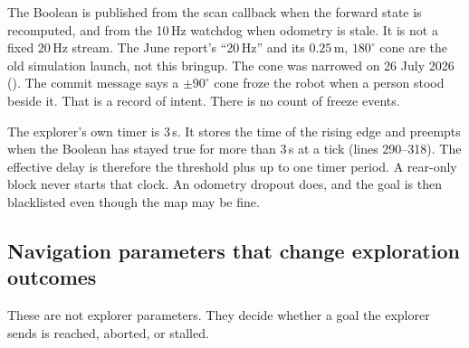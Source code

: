 \documentclass[11pt]{article}
\begin{document}
The Boolean is published from the scan callback when the forward state is recomputed, and from the 10\,Hz watchdog when odometry is stale. It is not a fixed 20\,Hz stream. The June report's ``20\,Hz'' and its $0.25$\,m, $180^\circ$ cone are the old simulation launch, not this bringup. The cone was narrowed on 26 July 2026 (). The commit message says a $\pm 90^\circ$ cone froze the robot when a person stood beside it. That is a record of intent. There is no count of freeze events.

The explorer's own timer is 3\,s. It stores the time of the rising edge and preempts when the Boolean has stayed true for more than 3\,s at a tick (lines 290--318). The effective delay is therefore the threshold plus up to one timer period. A rear-only block never starts that clock. An odometry dropout does, and the goal is then blacklisted even though the map may be fine.

\subsection{Navigation parameters that change exploration outcomes}
These are not explorer parameters. They decide whether a goal the explorer sends is reached, aborted, or stalled.
\end{document}
